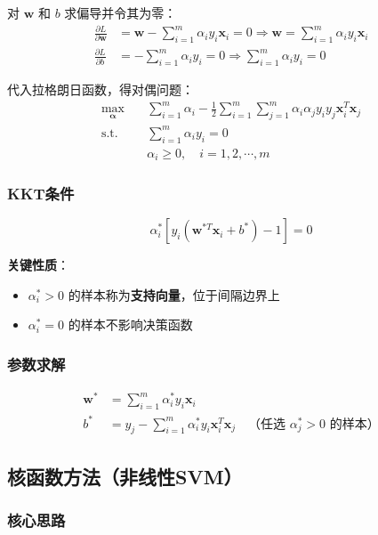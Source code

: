 \documentclass[12pt,a4paper]{ctexart}
\begin{document}
对 $\mathbf{w}$ 和 $b$ 求偏导并令其为零：
\begin{align}
\frac{\partial L}{\partial \mathbf{w}} &= \mathbf{w} - \sum_{i=1}^{m}\alpha_i y_i \mathbf{x}_i = 0 \Rightarrow \mathbf{w} = \sum_{i=1}^{m}\alpha_i y_i \mathbf{x}_i \\
\frac{\partial L}{\partial b} &= -\sum_{i=1}^{m}\alpha_i y_i = 0 \Rightarrow \sum_{i=1}^{m}\alpha_i y_i = 0
\end{align}

代入拉格朗日函数，得对偶问题：
\begin{align}
\max_{\boldsymbol{\alpha}} \quad & \sum_{i=1}^{m}\alpha_i - \frac{1}{2}\sum_{i=1}^{m}\sum_{j=1}^{m}\alpha_i\alpha_j y_i y_j \mathbf{x}_i^T\mathbf{x}_j \\
\text{s.t.} \quad & \sum_{i=1}^{m}\alpha_i y_i = 0 \\
& \alpha_i \geq 0, \quad i = 1, 2, \cdots, m
\end{align}

\subsubsection{KKT条件}

\[
\alpha_i^*\left[y_i(\mathbf{w}^{*T}\mathbf{x}_i + b^*) - 1\right] = 0
\]

\textbf{关键性质}：
\begin{itemize}
    \item $\alpha_i^* > 0$ 的样本称为\textbf{支持向量}，位于间隔边界上
    \item $\alpha_i^* = 0$ 的样本不影响决策函数
\end{itemize}

\subsubsection{参数求解}

\begin{align}
\mathbf{w}^* &= \sum_{i=1}^{m}\alpha_i^* y_i \mathbf{x}_i \\
b^* &= y_j - \sum_{i=1}^{m}\alpha_i^* y_i \mathbf{x}_i^T\mathbf{x}_j \quad \text{（任选 $\alpha_j^* > 0$ 的样本）}
\end{align}

\subsection{核函数方法（非线性SVM）}

\subsubsection{核心思路}
\end{document}
